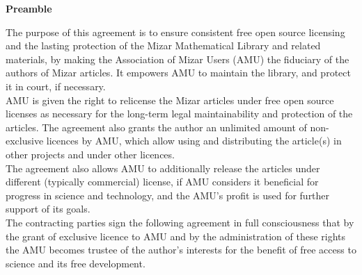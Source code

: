 
\begin{center}
{\Large\bf Preamble}
\end{center}

The purpose of this agreement is to ensure consistent free open source
licensing and the lasting protection of the Mizar Mathematical Library
and related materials, by making the
Association of Mizar Users (AMU) the fiduciary of the authors of
Mizar articles.  It empowers AMU to maintain the library, and protect
it in court, if necessary.\\

AMU is given the right to relicense the Mizar articles under free open
source licenses as necessary for the long-term legal maintainability
and protection of the articles. The agreement also grants the author
an unlimited amount of non-exclusive licences by AMU, which allow
using and distributing the article(s) in
other projects and under other licences. \\

The agreement also allows AMU to
additionally release the articles under different (typically
commercial) license, if AMU considers it beneficial for progress in
science and technology, and the AMU's profit is used for further support
of its goals.\\

The contracting parties sign the following agreement in full
consciousness that by the grant of exclusive licence to AMU and by the
administration of these rights the AMU becomes trustee of the author's
interests for the benefit of free access to science and its free development.\\



 



